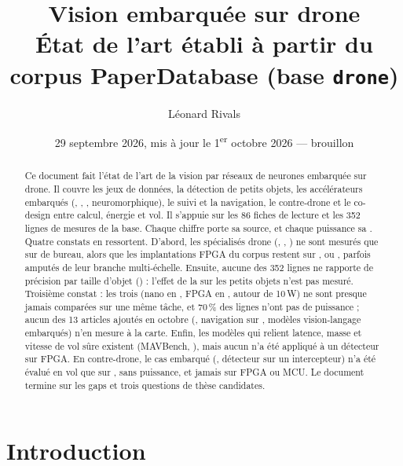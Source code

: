 \documentclass[11pt,a4paper]{article}
\title{\textbf{Vision embarquée sur drone}\\[0.3em]
  \large État de l'art établi à partir du corpus PaperDatabase (base \texttt{drone})}
\author{Léonard Rivals}
\date{29 septembre 2026, mis à jour le 1\textsuperscript{er} octobre 2026 --- brouillon}
\begin{document}
\maketitle

\begin{abstract}
Ce document fait l'état de l'art de la vision par réseaux de neurones embarquée sur
drone. Il couvre les jeux de données, la détection de petits objets, les accélérateurs
embarqués (, , , neuromorphique), le suivi et la navigation, le contre-drone
et le co-design entre calcul, énergie et vol. Il s'appuie sur les 86 fiches de lecture et
les 352 lignes de mesures de la base. Chaque chiffre porte sa source, et
chaque puissance sa . Quatre constats en ressortent. D'abord, les  spécialisés
drone (, , ) ne sont mesurés que sur  de bureau, alors que
les implantations FPGA du corpus restent sur ,  ou , parfois amputés
de leur branche multi-échelle. Ensuite, aucune des 352 lignes ne rapporte de précision
par taille d'objet () : l'effet de la  sur les petits objets n'est pas
mesuré. Troisième constat : les trois  (nano en , FPGA en , 
autour de 10\,W) ne sont presque jamais comparées sur une même tâche, et 70\,\% des lignes
n'ont pas de puissance ; aucun des 13 articles ajoutés en octobre (, navigation sur
, modèles vision-langage embarqués) n'en mesure à la carte. Enfin, les modèles qui relient latence, masse et vitesse de vol
sûre existent (MAVBench, ), mais aucun n'a été appliqué à un détecteur sur FPGA.
En contre-drone, le cas embarqué (, détecteur sur un intercepteur)
n'a été évalué en vol que sur , sans puissance, et jamais sur  FPGA ou MCU. Le document termine sur les gaps et trois questions de
thèse candidates.
\end{abstract}

\tableofcontents

\section{Introduction}
\end{document}
